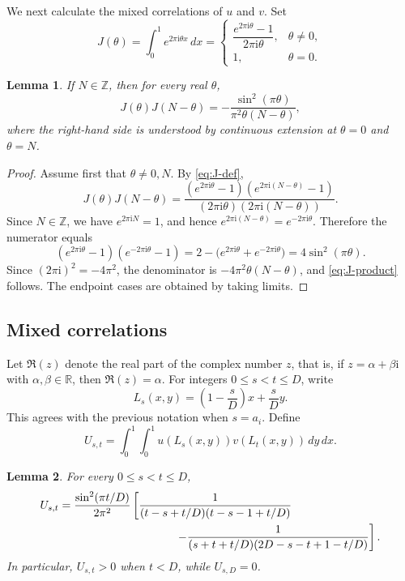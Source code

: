 \documentclass[twoside,12pt]{article}
\newcommand{\R}{\mathbb{R}}
\newcommand{\Z}{\mathbb{Z}}
\newcommand{\1}{\mathbf 1}
\newtheorem{lemma}{Lemma}[section]
\begin{document}
We next calculate the mixed correlations of \(u\) and \(v\).  Set
\begin{equation}\label{eq:J-def}
J(\theta)=
\int_0^1 e^{2\pi \mathrm i \theta x}\,dx
=
\begin{cases}
\dfrac{e^{2\pi \mathrm i\theta}-1}{2\pi \mathrm i\theta}, & \theta\ne0,\\[8pt]
1, & \theta=0.
\end{cases}
\end{equation}

\begin{lemma}\label{lem:J-product}
If \(N\in\Z\), then for every real \(\theta\),
\begin{equation}\label{eq:J-product}
J(\theta)J(N-\theta)
=
-\frac{\sin^2(\pi\theta)}{\pi^2\theta(N-\theta)},
\end{equation}
where the right-hand side is understood by continuous extension at
\(\theta=0\) and \(\theta=N\).
\end{lemma}

\begin{proof}
Assume first that \(\theta\ne0,N\).  By \eqref{eq:J-def},
\[
J(\theta)J(N-\theta)
=
\frac{(e^{2\pi \mathrm i\theta}-1)(e^{2\pi \mathrm i(N-\theta)}-1)}
{(2\pi \mathrm i\theta)(2\pi \mathrm i(N-\theta))}.
\]
Since \(N\in\Z\), we have \(e^{2\pi \mathrm iN}=1\), and hence
\(e^{2\pi \mathrm i(N-\theta)}=e^{-2\pi \mathrm i\theta}\).  Therefore the
numerator equals
\[
(e^{2\pi \mathrm i\theta}-1)(e^{-2\pi \mathrm i\theta}-1)
=
2-\bigl(e^{2\pi \mathrm i\theta}+e^{-2\pi \mathrm i\theta}\bigr)
=
4\sin^2(\pi\theta).
\]
Since \((2\pi \mathrm i)^2=-4\pi^2\), the denominator is
\(-4\pi^2\theta(N-\theta)\), and \eqref{eq:J-product} follows.  The endpoint
cases are obtained by taking limits.
\end{proof}

\subsection{Mixed correlations}

Let \(\Re(z)\) denote the real part of the complex number \(z\), that is, if
\(z=\alpha+\beta\mathrm i\) with \(\alpha,\beta\in\R\), then
\(\Re(z)=\alpha\).  For integers \(0\le s<t\le D\), write
\[
L_s(x,y)=\left(1-\frac{s}{D}\right)x+\frac{s}{D}y.
\]
This agrees with the previous notation when \(s=a_i\).  Define
\[
U_{s,t}=
\int_0^1\!\int_0^1 u(L_s(x,y))v(L_t(x,y))\,dy\,dx.
\]

\begin{lemma}\label{lem:Uab}
For every \(0\le s<t\le D\),
\begin{align}\label{eq:Uab}
U_{s,t}
&=
\frac{\sin^2(\pi t/D)}{2\pi^2}
\left[
\frac{1}{(t-s+t/D)(t-s-1+t/D)}
\right. \notag\\
&\hspace{3.6cm}\left.
-
\frac{1}{(s+t+t/D)(2D-s-t+1-t/D)}
\right].
\end{align}
In particular, \(U_{s,t}>0\) when \(t<D\), while \(U_{s,D}=0\).
\end{lemma}
\end{document}
